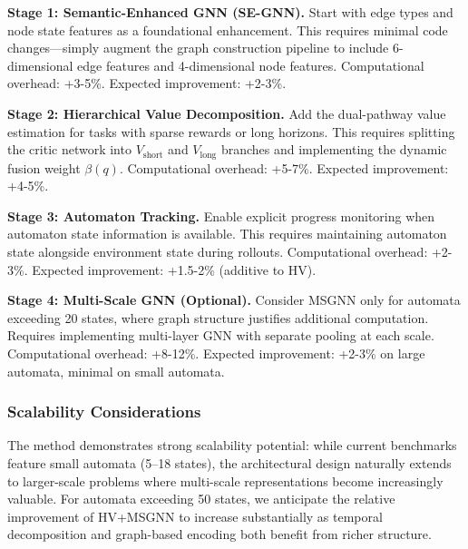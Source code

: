 \documentclass{article}
\begin{document}
\textbf{Stage 1: Semantic-Enhanced GNN (SE-GNN).} Start with edge types and node state features as a foundational enhancement. This requires minimal code changes—simply augment the graph construction pipeline to include 6-dimensional edge features and 4-dimensional node features. Computational overhead: +3-5\%. Expected improvement: +2-3\%.

\textbf{Stage 2: Hierarchical Value Decomposition.} Add the dual-pathway value estimation for tasks with sparse rewards or long horizons. This requires splitting the critic network into $V_{\text{short}}$ and $V_{\text{long}}$ branches and implementing the dynamic fusion weight $\beta(q)$. Computational overhead: +5-7\%. Expected improvement: +4-5\%.

\textbf{Stage 3: Automaton Tracking.} Enable explicit progress monitoring when automaton state information is available. This requires maintaining automaton state alongside environment state during rollouts. Computational overhead: +2-3\%. Expected improvement: +1.5-2\% (additive to HV).

\textbf{Stage 4: Multi-Scale GNN (Optional).} Consider MSGNN only for automata exceeding 20 states, where graph structure justifies additional computation. Requires implementing multi-layer GNN with separate pooling at each scale. Computational overhead: +8-12\%. Expected improvement: +2-3\% on large automata, minimal on small automata.

\subsubsection{Scalability Considerations}

The method demonstrates strong scalability potential: while current benchmarks feature small automata (5--18 states), the architectural design naturally extends to larger-scale problems where multi-scale representations become increasingly valuable. For automata exceeding 50 states, we anticipate the relative improvement of HV+MSGNN to increase substantially as temporal decomposition and graph-based encoding both benefit from richer structure.
\end{document}
